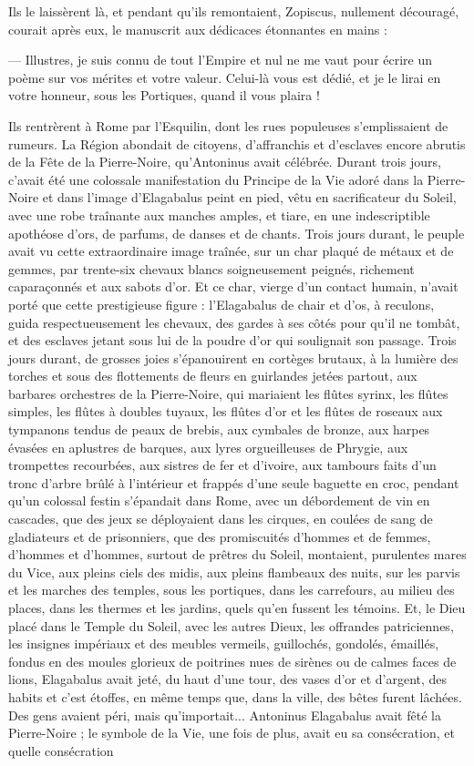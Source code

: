 \documentclass[a4paper, 11pt, oneside, polutonikogreek, french]{article}
\begin{document}
Ils le laissèrent là, et pendant qu'ils remontaient, Zopiscus, nullement découragé, courait après eux, le manuscrit aux dédicaces étonnantes en mains :

--- Illustres, je suis connu de tout l'Empire et nul ne me vaut pour écrire un poème sur vos mérites et votre valeur. Celui-là vous est dédié, et je le lirai en votre honneur, sous les Portiques, quand il vous plaira !

Ils rentrèrent à Rome par l'Esquilin, dont les rues populeuses s'emplissaient de rumeurs. La Région abondait de citoyens, d'affranchis et d'esclaves encore abrutis de la Fête de la Pierre-Noire, qu'Antoninus avait célébrée. Durant trois jours, c'avait été une colossale manifestation du Principe de la Vie adoré dans la Pierre-Noire et dans l'image d'Elagabalus peint en pied, vêtu en sacrificateur du Soleil, avec une robe traînante aux manches amples, et tiare, en une indescriptible apothéose d'ors, de parfums, de danses et de chants. Trois jours durant, le peuple avait vu cette extraordinaire image traînée, sur un char plaqué de métaux et de gemmes, par trente-six chevaux blancs soigneusement peignés, richement caparaçonnés et aux sabots d'or. Et ce char, vierge d'un contact humain, n'avait porté que cette prestigieuse figure : l'Elagabalus de chair et d'os, à reculons, guida respectueusement les chevaux, des gardes à ses côtés pour qu'il ne tombât, et des esclaves jetant sous lui de la poudre d'or qui soulignait son passage. Trois jours durant, de grosses joies s'épanouirent en cortèges brutaux, à la lumière des torches et sous des flottements de fleurs en guirlandes jetées partout, aux barbares orchestres de la Pierre-Noire, qui mariaient les flûtes syrinx, les flûtes simples, les flûtes à doubles tuyaux, les flûtes d'or et les flûtes de roseaux aux tympanons tendus de peaux de brebis, aux cymbales de bronze, aux harpes évasées en aplustres de barques, aux lyres orgueilleuses de Phrygie, aux trompettes recourbées, aux sistres de fer et d'ivoire, aux tambours faits d'un tronc d'arbre brûlé à l'intérieur et frappés d'une seule baguette en croc, pendant qu'un colossal festin s'épandait dans Rome, avec un débordement de vin en cascades, que des jeux se déployaient dans les cirques, en coulées de sang de gladiateurs et de prisonniers, que des promiscuités d'hommes et de femmes, d'hommes et d'hommes, surtout de prêtres du Soleil, montaient, purulentes mares du Vice, aux pleins ciels des midis, aux pleins flambeaux des nuits, sur les parvis et les marches des temples, sous les portiques, dans les carrefours, au milieu des places, dans les thermes et les jardins, quels qu'en fussent les témoins. Et, le Dieu placé dans le Temple du Soleil, avec les autres Dieux, les offrandes patriciennes, les insignes impériaux et des meubles vermeils, guillochés, gondolés, émaillés, fondus en des moules glorieux de poitrines nues de sirènes ou de calmes faces de lions, Elagabalus avait jeté, du haut d'une tour, des vases d'or et d'argent, des habits et c'est étoffes, en même temps que, dans la ville, des bêtes furent lâchées. Des gens avaient péri, mais qu'importait... Antoninus Elagabalus avait fêté la Pierre-Noire ; le symbole de la Vie, une fois de plus, avait eu sa consécration, et quelle consécration 
\end{document}
